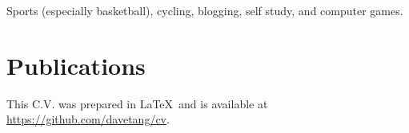 \documentclass[a4paper, 11pt]{article}
\begin{document}
Sports (especially basketball), cycling, blogging, self study, and computer games.

\section*{Publications}
\begingroup
   \renewcommand{\section}[2]{}%
   
   \nocite{*}
   
\endgroup

\vfill

\footnotesize
This C.V. was prepared in \LaTeX\ and is available at \href{https://github.com/davetang/cv}{https://github.com/davetang/cv}.
\end{document}
